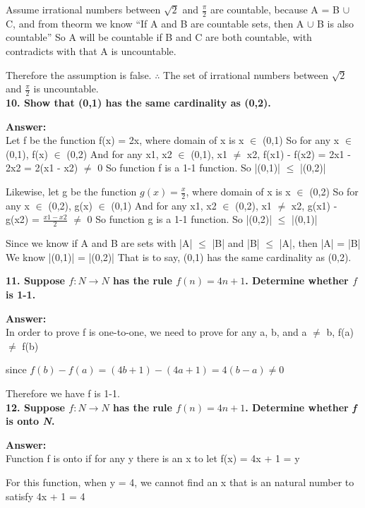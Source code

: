 \documentclass{article}
\begin{document}
\begin{large}
Assume irrational numbers between $\sqrt{2}$ and $\frac{\pi}{2}$ are countable, 
because A = B $\cup$ C, and from theorm we know ``If A and B are countable sets, then A $\cup$ B is also countable''
So A will be countable if B and C are both countable, with contradicts with that A is uncountable.

Therefore the assumption is false. 
$\therefore$ The set of irrational numbers between $\sqrt{2}$ and $\frac{\pi}{2}$ is uncountable.\\


\textbf{10. Show that (0,1) has the same cardinality as (0,2).}

\textbf{Answer:} \\

Let f be the function f(x) = 2x, where domain of x is x $\in$ (0,1)
So for any x $\in$ (0,1), f(x) $\in$ (0,2)
And for any x1, x2 $\in$ (0,1), x1 $\neq$ x2, f(x1) - f(x2) = 2x1 - 2x2 = 2(x1 - x2) $\neq$ 0
So function f is a 1-1 function.
So |(0,1)| $\le$ |(0,2)|

Likewise, let g be the function $g(x) = \frac{x}{2}$, where domain of x is x $\in$ (0,2)
So for any x $\in$ (0,2), g(x) $\in$ (0,1)
And for any x1, x2 $\in$ (0,2), x1 $\neq$ x2, g(x1) - g(x2) = $\frac{x1 - x2}{2}$ $\neq$ 0
So function g is a 1-1 function.
So |(0,2)| $\le$ |(0,1)|

Since we know if A and B are sets with |A| $\le$ |B| and |B| $\le$ |A|, then |A| = |B|
We know |(0,1)| = |(0,2)|
That is to say, (0,1) has the same cardinality as (0,2).


\textbf{11. Suppose $f:N\to N$ has the rule $f(n)=4n+1$. Determine whether $f$ is 1-1.}

\textbf{Answer:} \\

In order to prove f is one-to-one, we need to prove for any a, b, and a $\neq$ b, f(a) $\neq$ f(b)

since $f(b) - f(a) = (4b + 1) - (4a + 1) = 4(b-a) \neq 0$

Therefore we have f is 1-1.\\


\textbf{12. Suppose $f:N\to N$ has the rule $f(n)=4n+1$. Determine whether \emph{f} is onto \emph{N}.}

\textbf{Answer:} \\

Function f is onto if for any y there is an x to let f(x) = 4x + 1 = y

For this function, when y = 4, we cannot find an x that is an natural number to satisfy 4x + 1 = 4


\end{large}
\end{document}
